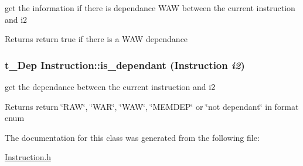 get the information if there is dependance WAW between the current instruction and i2 \begin{DoxyReturn}{Returns}
return true if there is a WAW dependance 
\end{DoxyReturn}
\hypertarget{classInstruction_a7e93717c1e9df6fed09105accb6c728c}{
\subsubsection[{is\_\-dependant}]{\setlength{\rightskip}{0pt plus 5cm}t\_\-Dep Instruction::is\_\-dependant ({\bf Instruction} {\em i2})}}
\label{classInstruction_a7e93717c1e9df6fed09105accb6c728c}


get the dependance between the current instruction and i2 \begin{DoxyReturn}{Returns}
return \char`\"{}RAW\char`\"{}, \char`\"{}WAR\char`\"{}, \char`\"{}WAW\char`\"{}, \char`\"{}MEMDEP\char`\"{} or \char`\"{}not dependant\char`\"{} in format enum 
\end{DoxyReturn}


The documentation for this class was generated from the following file:\begin{DoxyCompactItemize}
\item 
\hyperlink{Instruction_8h}{Instruction.h}\end{DoxyCompactItemize}
